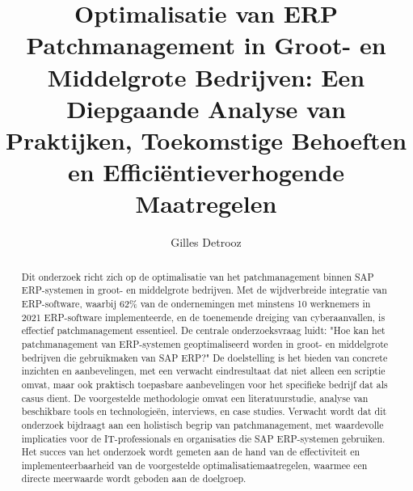 \documentclass{hogent-article}
\title{Optimalisatie van ERP Patchmanagement in Groot- en Middelgrote Bedrijven: Een Diepgaande Analyse van Praktijken, Toekomstige Behoeften en Efficiëntieverhogende Maatregelen}
\author{Gilles Detrooz}
\begin{document}
\begin{abstract}
    Dit onderzoek richt zich op de optimalisatie van het patchmanagement binnen SAP ERP-systemen in groot- en middelgrote bedrijven. Met de wijdverbreide integratie van ERP-software, waarbij 62\% van de ondernemingen met minstens 10 werknemers in 2021 ERP-software implementeerde, en de toenemende dreiging van cyberaanvallen, is effectief patchmanagement essentieel. De centrale onderzoeksvraag luidt: "Hoe kan het patchmanagement van ERP-systemen geoptimaliseerd worden in groot- en middelgrote bedrijven die gebruikmaken van SAP ERP?" De doelstelling is het bieden van concrete inzichten en aanbevelingen, met een verwacht eindresultaat dat niet alleen een scriptie omvat, maar ook praktisch toepasbare aanbevelingen voor het specifieke bedrijf dat als casus dient. De voorgestelde methodologie omvat een literatuurstudie, analyse van beschikbare tools en technologieën, interviews, en case studies. Verwacht wordt dat dit onderzoek bijdraagt aan een holistisch begrip van patchmanagement, met waardevolle implicaties voor de IT-professionals en organisaties die SAP ERP-systemen gebruiken. Het succes van het onderzoek wordt gemeten aan de hand van de effectiviteit en implementeerbaarheid van de voorgestelde optimalisatiemaatregelen, waarmee een directe meerwaarde wordt geboden aan de doelgroep.
\tableofcontents
\end{abstract}



\printbibliography[heading=bibintoc]
\end{document}
